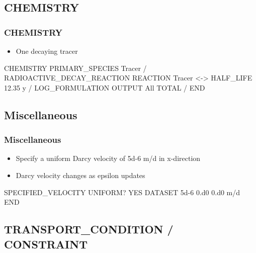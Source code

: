 \documentclass{beamer}
\begin{document}
\subsection{CHEMISTRY}

\begin{frame}\frametitle{CHEMISTRY}

\begin{itemize}
\item One decaying tracer
\end{itemize}

\begin{semiverbatim}
CHEMISTRY
  PRIMARY_SPECIES
     Tracer
  /
  RADIOACTIVE_DECAY_REACTION
    REACTION Tracer <->
    HALF_LIFE 12.35 y
  /
  LOG_FORMULATION
  OUTPUT
    All
    TOTAL
  /
END
\end{semiverbatim}

\end{frame}

\subsection{Miscellaneous}

\begin{frame}[fragile]\frametitle{Miscellaneous}

\begin{itemize}
\item Specify a uniform Darcy velocity of 5d-6 m/d in x-direction
\item Darcy velocity changes as epsilon updates
\end{itemize}


\begin{semiverbatim}

SPECIFIED_VELOCITY
  UNIFORM? YES
  DATASET 5d-6 0.d0 0.d0 m/d
END
\end{semiverbatim}

\end{frame}


\subsection{TRANSPORT\_CONDITION / CONSTRAINT}
\end{document}
